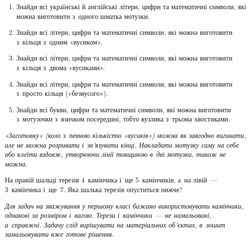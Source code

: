 \begin{enumerate}
  \item Знайди всі українські й англійські літери, цифри
  та математичні символи, які можна виготовити з~одного шматка мотузки.
  \item Знайди всі літери, цифри та математичні символи,
  які можна виготовити з~кільця з~одним «вусиком».
  \item Знайди всі літери, цифри та математичні символи,
  які можна виготовити з~кільця з~двома «вусиками».
  \item Знайди всі літери, цифри та математичні символи,
  які можна виготовити з~просто кільця («безвусого»).
  \item Знайди всі букви, цифри та математичні символи,
  які можна виготовити з~мотузочки з~язичком посередині,
  тобто вузлика з~трьома хвостиками.
\end{enumerate}

\emph{%
«Заготовку» (коло з~певною кількістю «вусиків») можна як завгодно вигинати,
але не можна розривати і~зв'язувати кінці.
Накладати мотузку саму на себе або клеїти вздовж,
утворюючи лінії товщиною в~дві мотузки, також не можна.
}


\problem
На правій шальці терезів 4~камінчика і~ще 5~камінчиків,
а~на лівій~--- 3~камінчика і~ще~7.
Яка шалька терезів опуститься нижче?

\emph{%
Для задач на зважування у першому класі бажано використовувати
камінчики, однакові за розміром і~вагою.
Терези і~камінчики~--- не намальовані, а~справжні.
Задачу слід вирішувати на матеріальних об’єктах,
в~зошит замальовувати вже готове рішення.
}



